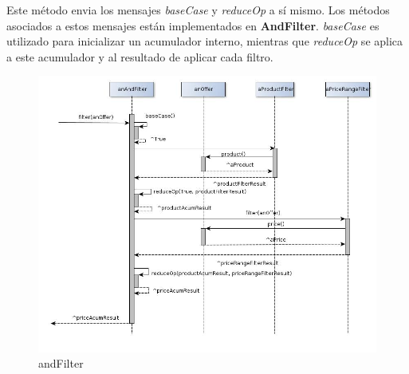 \documentclass[10pt, a4paper]{article}
\begin{document}
 Este método envia los mensajes \emph{baseCase} y \emph{reduceOp} a sí mismo. Los métodos asociados a estos mensajes están implementados en \textbf{AndFilter}. \emph{baseCase} es utilizado para inicializar un acumulador interno, mientras que \emph{reduceOp} se aplica a este acumulador y al resultado de aplicar cada filtro.
\begin{figure}[H]
\centering
\includegraphics[scale=0.55]{graphics/andFilter_sequence.jpg}
\caption{andFilter}
\end{figure}
\end{document}
